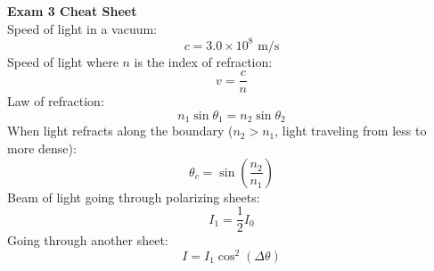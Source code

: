 \documentclass[11pt]{article}
\begin{document}
    \noindent \textbf{Exam 3 Cheat Sheet}%
    \\ \noindent \newline
    Speed of light in a vacuum:
      \begin{equation}
        c  =  3.0 \times 10^8 \text{ m/s} \tag{in a vacuum}
    \end{equation}
    Speed of light where $n$ is the index of refraction:
    \begin{equation}
      v = \frac{c}{n} \tag{speed of light}
    \end{equation}
    Law of refraction:
\begin{equation}
  n_1 \sin \theta_1 = n_2 \sin \theta_2 \tag{Snell's Law}
\end{equation}
When light refracts along the boundary ($n_2 > n_1$, light traveling from less to more dense):
\begin{equation}
  \theta_c = \sin (\frac{n_2}{n_1}) \tag{Critical angle}
\end{equation}
Beam of light going through polarizing sheets:
\begin{equation}
  I_1 = \frac{1}{2} I_0 \tag{one half rule}
 \end{equation}
   Going through another sheet:
   \begin{equation}
     I = I_1 \cos^2 (\Delta \theta) \tag{cosine-squared}
    \end{equation}
\end{document}
